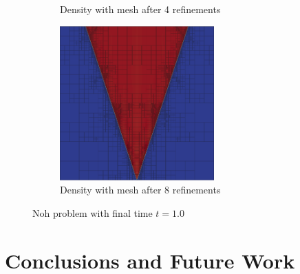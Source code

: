 \documentclass[preprint,12pt]{elsarticle}
\begin{document}
\begin{figure}[p]
\begin{subfigure}[c]{0.45\textwidth}
\caption{Density with mesh after 4 refinements}
\label{fig:noh_mesh4}
\end{subfigure}
\begin{subfigure}[c]{0.9\textwidth}
\centering
\includegraphics[width=0.65\textwidth]{SpaceTimeCNS/Noh1e-3/mesh9.png}
\caption{Density with mesh after 8 refinements}
\label{fig:noh_mesh8}
\end{subfigure}
\caption{Noh problem with final time $t=1.0$}
\label{fig:noh}
\end{figure}

\section{Conclusions and Future Work}



 






\end{document}
